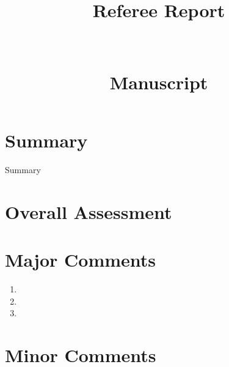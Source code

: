 \documentclass[12pt]{article}
\title{%
    \large Referee Report\\[0.4em]
    \normalsize \journalname\\
    \small \textit{\manuscripttitle}\\
    \small Manuscript \manuscriptid
}
\author{}
\date{\reportdate}
\begin{document}
\maketitle
\thispagestyle{empty}

\section*{Summary}

Summary \citep{example2020}

\section*{Overall Assessment}


\section*{Major Comments}


\begin{enumerate}
    \item
    \item
    \item
\end{enumerate}

\section*{Minor Comments}

\end{document}
